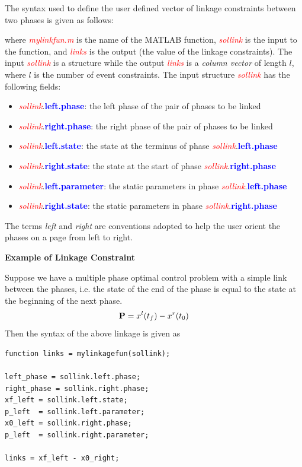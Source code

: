 \documentclass[10pt,final]{report}
\newenvironment{shadedframe}{%
  \def\FrameCommand{\fcolorbox{black}{shadecolor}}%
  \MakeFramed {\FrameRestore}}
{\endMakeFramed}
\newcommand{\bfblue}[1]{\textcolor{blue}{\bf #1}}
\newcommand{\slred}[1]{\textcolor{red}{\sl #1}}
\begin{document}
The syntax used to define the user defined vector of linkage
constraints between two phases is given as follows:
\begin{center}
\end{center}
{\noindent}where \slred{mylinkfun.m} is the name of the MATLAB function,
\slred{sollink} is the input to the function, and \slred{links} is the output (\ie the value of the linkage
constraints).  The input \slred{sollink} is a structure while the output \slred{links} is a {\em column vector} of length $l$,
where $l$ is the number of event constraints. The input structure \slred{sollink} has the following fields:
\begin{itemize}
  \item \slred{sollink}.\bfblue{left.phase}:  the left phase of the
    pair of phases to be linked
  \item \slred{sollink}.\bfblue{right.phase}:  the right phase of the pair of phases to be linked
  \item \slred{sollink}.\bfblue{left.state}: the state at the terminus of phase \slred{sollink}.\bfblue{left.phase}
  \item \slred{sollink}.\bfblue{right.state}: the state at the start of phase \slred{sollink}.\bfblue{right.phase}
  \item \slred{sollink}.\bfblue{left.parameter}: the static parameters in phase \slred{sollink}.\bfblue{left.phase}
  \item \slred{sollink}.\bfblue{right.state}: the static parameters in phase \slred{sollink}.\bfblue{right.phase}
\end{itemize}
The terms {\em left} and {\em right} are conventions adopted to help
the user orient the phases on a page from left to right.

\begin{shadedframe}
{\noindent}{\bf Example of Linkage Constraint}
\vspace{12pt}

{\noindent}Suppose we have a multiple phase optimal control problem with a simple link between the phases, i.e. the state of the end of the phase is equal to the state at the beginning of the next phase.  \begin{displaymath}
\bfP = x^l(t_f) - x^r(t_0)
\end{displaymath}
Then the syntax of the above linkage is given as
\begin{verbatim}
function links = mylinkagefun(sollink);

left_phase = sollink.left.phase;
right_phase = sollink.right.phase;
xf_left = sollink.left.state;
p_left  = sollink.left.parameter;
x0_left = sollink.right.phase;
p_left  = sollink.right.parameter;

links = xf_left - x0_right;
\end{verbatim}
\end{shadedframe}
\end{document}
